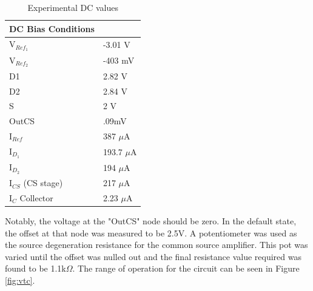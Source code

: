 		
		\begin{table}[H]
			\centering
			\caption{Experimental DC values}
			\label{tab:expdc}
			\begin{tabular}{|l|l|}
				\hline
				\textbf{DC Bias Conditions} &           \\ \hline
				V$_{Ref_1}$                        & -3.01 V   \\ \hline
				V$_{Ref_2}$                        & -403 mV \\ \hline
				D1                          & 2.82 V     \\ \hline
				D2                          & 2.84 V     \\ \hline
				S                           & 2 V    \\ \hline
				OutCS                       & .09mV      \\ \hline
				I$_{Ref}$                        & 387 $\mu$A \\ \hline
				I$_{D_1}$                        &  193.7 $\mu$A\\ \hline
				I$_{D_2}$                        & 194 $\mu$A  \\ \hline
				I$_{CS}$  (CS stage)                      & 217 $\mu$A \\ \hline
				I$_{C}$   Collector                     & 2.23 $\mu$A \\ \hline
				
			\end{tabular}
		\end{table}
		
		Notably, the voltage at the "OutCS" node should be zero. In the default state, the offset at that node was measured to be 2.5V. A potentiometer was used as the source degeneration resistance for the common source amplifier. This pot was varied until the offset was nulled out and the final resistance value required was found to be 1.1k$\Omega$. The range of operation for the circuit can be seen in Figure \ref{fig:vtc}.
		
